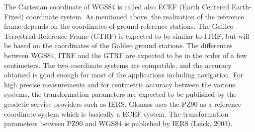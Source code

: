 The Cartesian coordinate of WGS84 is called also
ECEF (Earth Centered Earth-Fixed) coordinate system.
As mentioned above, the realization of the reference frame depends on the coordinates of ground
reference stations. The Galileo Terrestrial Reference Frame (GTRF) is expected to be similar to
ITRF, but will be based on the coordinates of the Galileo ground stations. The differences
between WGS84, ITRF and the GTRF are expected to be in the order of a few centimeters. The
two coordinate systems are compatible, and the accuracy obtained is good enough for most of the
applications including navigation. For high precise measurements and for centmetric accuracy
between the various systems, the transformation parameters are expected to be published by the
geodetic service providers such as IERS. Glonass uses the PZ90 as a reference coordinate system
which is basically a ECEF system. The transformation parameters between PZ90 and WGS84 is
published by IERS (Leick, 2003).


